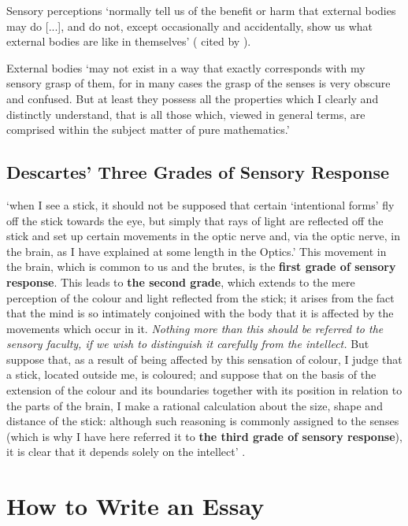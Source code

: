 \documentclass[12pt]{extarticle}
\begin{document}
\begin{multicols*}{3}
Sensory perceptions ‘normally tell us of the benefit or harm that external bodies may do [...], and do not, except occasionally and accidentally, show us what external bodies are like in themselves’ 
(\citealp[p.~224, AT VIII: 41]{descartes:1985_csm1} cited by \citealp[p.~350]{simmons:1999_are}).
 
External bodies 
‘may not exist in a way that 
exactly corresponds with my  sensory grasp of them, 
for in many cases the 
grasp of the senses
 is very obscure and confused. 
But at least they possess all the properties which I clearly and distinctly understand, 
that is all those which, viewed in general terms, are comprised within the subject matter of pure mathematics.’
 
\subsection{Descartes’ Three Grades of Sensory Response}
‘when I see a stick, it should not be supposed that certain ‘intentional
forms’ fly off the stick towards the eye, but simply that rays of light
are reflected off the stick and set up certain movements in the optic nerve
and, via the optic nerve, in the brain, as I have explained at some length
in the Optics.' This movement in the brain, which is common to us and the
brutes, is the \textbf{first grade of sensory response}. This leads to 
\textbf{the second
grade}, which extends to the mere perception of the colour and light
reflected from the stick; it arises from the fact that the mind is so
intimately conjoined with the body that it is affected by the movements
which occur in it. 
\emph{Nothing more than this should be referred to the sensory
faculty, if we wish to distinguish it carefully from the intellect.} 
But
suppose that, as a result of being affected by this sensation of colour, I
judge that a stick, located outside me, is coloured; and suppose that on
the basis of the extension of the colour and its boundaries together with
its position in relation to the parts of the brain, I make a rational
calculation about the size, shape and distance of the stick: although such
reasoning is commonly assigned to the senses (which is why I have here
referred it to \textbf{the third grade of sensory response}), it is clear that it
depends solely on the intellect’
\citep[p.~295, AT VII:437]{descartes:1985_csm2}.

 
\section{How to Write an Essay}
 

\end{multicols*}
\end{document}
